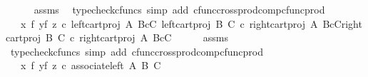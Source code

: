 \begin{isabellebody}
\ \ \ \ \isamarkupfalse%
\ assms\ \isamarkupfalse%
\ {\isacharparenleft}{\kern0pt}typecheck{\isacharunderscore}{\kern0pt}cfuncs{\isacharcomma}{\kern0pt}\ simp\ add{\isacharcolon}{\kern0pt}\ cfunc{\isacharunderscore}{\kern0pt}cross{\isacharunderscore}{\kern0pt}prod{\isacharunderscore}{\kern0pt}comp{\isacharunderscore}{\kern0pt}cfunc{\isacharunderscore}{\kern0pt}prod{\isacharparenright}{\kern0pt}\isanewline
\ \ \isamarkupfalse%
\ \isamarkupfalse%
\ {\isachardoublequoteopen}{\isachardot}{\kern0pt}{\isachardot}{\kern0pt}{\isachardot}{\kern0pt}\ {\isacharequal}{\kern0pt}\ {\isacharparenleft}{\kern0pt}{\isacharparenleft}{\kern0pt}x\ {\isasymtimes}\isactrlsub f\ y{\isacharparenright}{\kern0pt}{\isasymtimes}\isactrlsub f\ z{\isacharparenright}{\kern0pt}\ {\isasymcirc}\isactrlsub c\ {\isasymlangle}{\isasymlangle}left{\isacharunderscore}{\kern0pt}cart{\isacharunderscore}{\kern0pt}proj\ A\ {\isacharparenleft}{\kern0pt}B{\isasymtimes}\isactrlsub cC{\isacharparenright}{\kern0pt}{\isacharcomma}{\kern0pt}\ left{\isacharunderscore}{\kern0pt}cart{\isacharunderscore}{\kern0pt}proj\ B\ C\ {\isasymcirc}\isactrlsub c\ right{\isacharunderscore}{\kern0pt}cart{\isacharunderscore}{\kern0pt}proj\ A\ {\isacharparenleft}{\kern0pt}B{\isasymtimes}\isactrlsub cC{\isacharparenright}{\kern0pt}{\isasymrangle}{\isacharcomma}{\kern0pt}right{\isacharunderscore}{\kern0pt}cart{\isacharunderscore}{\kern0pt}proj\ B\ C\ {\isasymcirc}\isactrlsub c\ right{\isacharunderscore}{\kern0pt}cart{\isacharunderscore}{\kern0pt}proj\ A\ {\isacharparenleft}{\kern0pt}B{\isasymtimes}\isactrlsub cC{\isacharparenright}{\kern0pt}{\isasymrangle}{\isachardoublequoteclose}\isanewline
\ \ \ \ \isamarkupfalse%
\ assms\ \isamarkupfalse%
\ {\isacharparenleft}{\kern0pt}typecheck{\isacharunderscore}{\kern0pt}cfuncs{\isacharcomma}{\kern0pt}\ simp\ add{\isacharcolon}{\kern0pt}\ cfunc{\isacharunderscore}{\kern0pt}cross{\isacharunderscore}{\kern0pt}prod{\isacharunderscore}{\kern0pt}comp{\isacharunderscore}{\kern0pt}cfunc{\isacharunderscore}{\kern0pt}prod{\isacharparenright}{\kern0pt}\isanewline
\ \ \isamarkupfalse%
\ \isamarkupfalse%
\ {\isachardoublequoteopen}{\isachardot}{\kern0pt}{\isachardot}{\kern0pt}{\isachardot}{\kern0pt}\ {\isacharequal}{\kern0pt}\ {\isacharparenleft}{\kern0pt}{\isacharparenleft}{\kern0pt}x\ {\isasymtimes}\isactrlsub f\ y{\isacharparenright}{\kern0pt}{\isasymtimes}\isactrlsub f\ z{\isacharparenright}{\kern0pt}\ {\isasymcirc}\isactrlsub c\ associate{\isacharunderscore}{\kern0pt}left\ A\ B\ C{\isachardoublequoteclose}\ \ \ \isanewline

\end{isabellebody}
